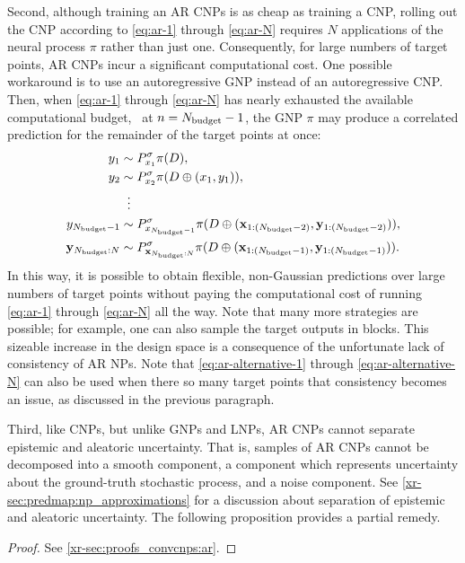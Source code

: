 \documentclass[12pt]{report}
\newcommand{\xrprefix}[1]{xr-#1}
\begin{document}
Second, although training an AR CNPs is as cheap as training a CNP, rolling out the CNP according to \eqref{eq:ar-1} through \eqref{eq:ar-N} requires $N$ applications of the neural process $\pi$ rather than just one. 
Consequently, for large numbers of target points, AR CNPs incur a significant computational cost.
One possible workaround is to use an autoregressive GNP instead of an autoregressive CNP.
Then, when \eqref{eq:ar-1} through \eqref{eq:ar-N} has nearly exhausted the available computational budget, \eg\ at $n = N\ss{budget} - 1$, the GNP $\pi$ may produce a correlated prediction for the remainder of the target points at once:
\begin{align}
    y_1 &\sim P^\sigma_{x_1} \pi(D), \label{eq:ar-alternative-1} \\
    y_2 &\sim P^\sigma_{x_2} \pi(D \oplus (x_1, y_1)), \\
        &\;\;\vdots \nonumber \\
y_{N\ss{budget} -1} &\sim P^\sigma_{x_{N\ss{budget} - 1}} \pi(D \oplus (\vx_{1:(N\ss{budget}-2)}, \vy_{1:(N\ss{budget}-2)})), \\
    \vy_{N\ss{budget}:N} &\sim P^\sigma_{\vx_{N\ss{budget}:N}} \pi(D \oplus (\vx_{1:(N\ss{budget}-1)}, \vy_{1:(N\ss{budget}-1)})). \label{eq:ar-alternative-N}
\end{align}
In this way, it is possible to obtain flexible, non-Gaussian predictions over large numbers of target points without paying the computational cost of running \eqref{eq:ar-1} through \eqref{eq:ar-N} all the way.
Note that many more strategies are possible;
for example, one can also sample the target outputs in blocks.
This sizeable increase in the design space is a consequence of the unfortunate lack of consistency of AR NPs.
Note that \eqref{eq:ar-alternative-1} through \eqref{eq:ar-alternative-N} can also be used when there so many target points that consistency becomes an issue, as discussed in the previous paragraph.

Third, like CNPs, but unlike GNPs and LNPs, AR CNPs cannot separate epistemic and aleatoric uncertainty.
That is, samples of AR CNPs cannot be decomposed into a smooth component, a component which represents uncertainty about the ground-truth stochastic process, and a noise component.
See \cref{\xrprefix{sec:predmap:np_approximations}} for a discussion about separation of epistemic and aleatoric uncertainty.
The following proposition provides a partial remedy.

\begin{proof}
    See \cref{\xrprefix{sec:proofs_convcnps:ar}}.
\end{proof}
\end{document}
